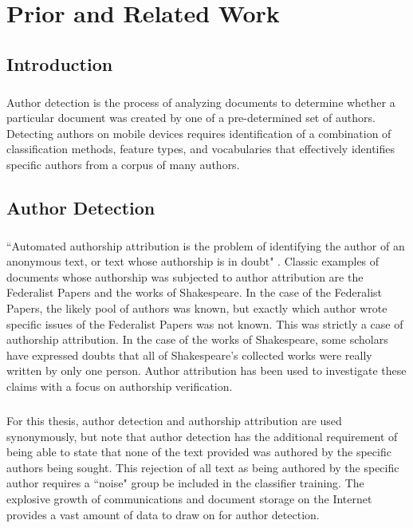 \chapter {Prior and Related Work}

\section {Introduction}
	\paragraph{}Author detection is the process of analyzing documents to determine whether a particular document was created by one of a pre-determined set of authors.   Detecting authors on mobile devices requires identification of a combination of classification methods, feature types, and vocabularies that effectively identifies specific authors from a corpus of many authors.

\section {Author Detection}
	\paragraph{}``Automated authorship attribution is the problem of identifying the author of an anonymous text, or text whose authorship is in doubt" \cite{love_attributing_2002}.  Classic examples of documents whose authorship was subjected to author attribution are the Federalist Papers and the works of Shakespeare.  In the case of the Federalist Papers, the likely pool of authors was known, but exactly which author wrote specific issues of the Federalist Papers was not known.\cite{mosteller_inference_1963}  This was strictly a case of authorship attribution. In the case of the works of Shakespeare, some scholars have expressed doubts that all of Shakespeare's collected works were really written by only one person.\cite{koppel_authorship_2004}  Author attribution has been used to investigate these claims with a focus on authorship verification.
	\paragraph{} For this thesis, author detection and authorship attribution are used synonymously, but note that author detection has the additional requirement of being able to state that none of the text provided was authored by the specific authors being sought. This rejection of all text as being authored by the specific author requires a ``noise" group be included in the classifier training. The explosive growth of communications and document storage on the Internet provides a vast amount of data to draw on for author detection.  
